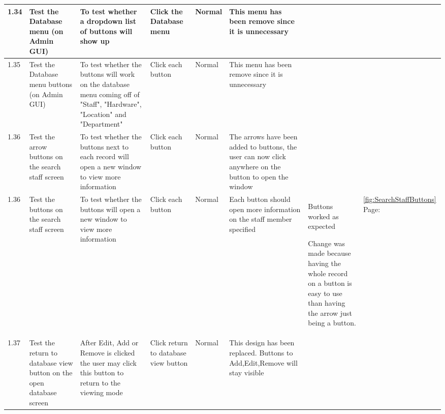 \begin{landscape}
\begin{center}
\begin{longtable}{|p{1.5cm}|p{2cm}|p{2.5cm}|p{2cm}|p{2cm}|p{2cm}|p{3cm}|p{1.7cm}|}
\rowcolor{gray}1.34 & Test the Database menu (on Admin GUI)  & To test whether a dropdown list of buttons will show up  & Click the Database menu & Normal  & This menu has been remove since it is unnecessary&& \\ \hline
\rowcolor{gray}1.35 & Test the Database menu buttons (on Admin GUI) & To test whether the buttons will work on the database menu coming off of  "Staff", "Hardware", "Location" and "Department"  & Click each button & Normal  &  This menu has been remove since it is unnecessary && \\ \hline

\rowcolor{gray}1.36 & Test the arrow buttons on the search staff screen & To test whether the buttons next to each record will open a new window to view more information  & Click each button & Normal  & The arrows have been added to buttons, the user can now click anywhere on the button to open the window && \\ \hline
\rowcolor{lightgray}1.36 & Test the buttons on the search staff screen & To test whether the buttons will open a new window to view more information  & Click each button & Normal  & Each button should open more information on the staff member specified& Buttons worked as expected\par Change was made because having the whole record on a button is easy to use than having the arrow just being a button. & \ref {fig:SearchStaffButtons}  Page: \pageref{fig:SearchStaffButtons} \\ \hline

\rowcolor{gray}1.37 & Test the return to database view button on the open database screen & After Edit, Add or Remove is clicked the user may click this button to return to the viewing mode & Click return to database view button & Normal  & This design has been replaced. Buttons to Add,Edit,Remove will stay visible && \\ \hline


\end{longtable}
\end{center}
\end{landscape}
